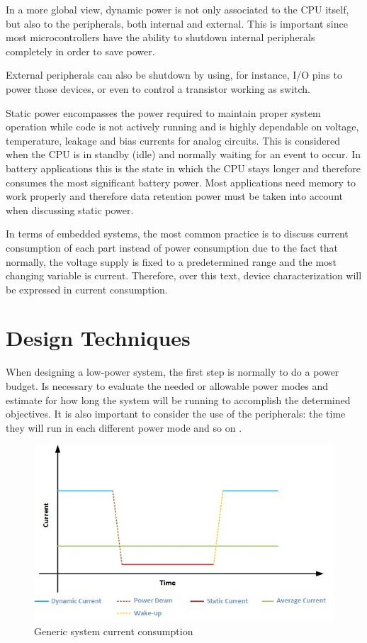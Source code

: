 \documentclass[11pt,a4paper]{report}
\begin{document}
In a more global view, dynamic power is not only associated to the CPU itself, but also to the peripherals, both internal and external. 
This is important since most microcontrollers have the ability to shutdown internal peripherals completely in order to save power. 

External peripherals can also be shutdown by using, for instance, I/O pins to power those devices, or even to control a transistor working as switch.

Static power encompasses the power required to maintain proper system operation while code is not actively running and is highly dependable on voltage, temperature, leakage and bias currents for analog circuits. This is considered when the CPU is in standby (idle) and normally waiting for an event to occur. In battery applications this is the state in which the CPU stays longer and therefore consumes the most significant battery power. Most applications need memory to work properly and therefore data retention power must be taken into account when discussing static power.
 
In terms of embedded systems, the most common practice is to discuss current consumption of each part instead of power consumption due to the fact that normally, the voltage supply is fixed to a predetermined range and the most changing variable is current. Therefore, over this text, device characterization will be expressed in current consumption. 

\section{Design Techniques}

When designing a low-power system, the first step is normally to do a power budget. Is necessary to evaluate
the needed or allowable power modes and estimate for how long the system will be running to accomplish the determined objectives. It is also important to consider the use of the peripherals: the time they will run in each different power mode and so on \cite{Ivey2011}.

\begin{figure}[ht!]
\centering
\includegraphics[width=0.9\linewidth]{Current_over_time.jpg}
\caption{Generic system current consumption }
\label{fig:Current_over_time}
\end{figure}
\end{document}
